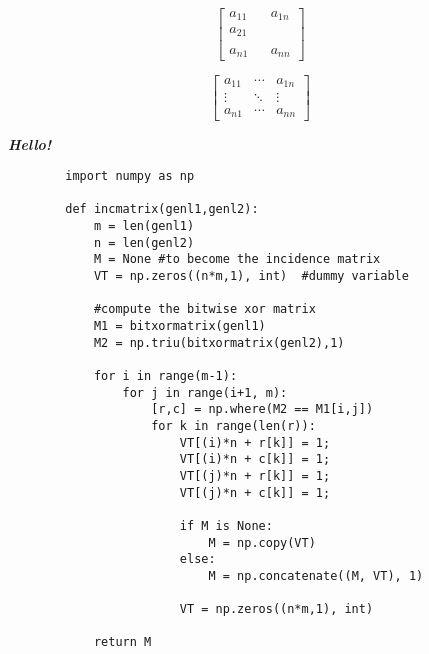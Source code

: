 \documentclass[12pt, a4paper]{article}
\begin{document}
    \begin{equation}
        \begin{bmatrix}
            a_{11} &  & a_{1n} \\
            a_{21} & & \\
            & & \\
            a_{n1} & & a_{nn}
        \end{bmatrix}
    \end{equation}
    
    \begin{equation}
        \begin{bmatrix}
            a_{11} & \cdots & a_{1n} \\
            \vdots & \ddots  & \vdots \\
            a_{n1} & \cdots & a_{nn}
        \end{bmatrix}
    \end{equation}

    \textbf{\textit{Hello!}}

    \begin{verbatim}
        import numpy as np
            
        def incmatrix(genl1,genl2):
            m = len(genl1)
            n = len(genl2)
            M = None #to become the incidence matrix
            VT = np.zeros((n*m,1), int)  #dummy variable
            
            #compute the bitwise xor matrix
            M1 = bitxormatrix(genl1)
            M2 = np.triu(bitxormatrix(genl2),1) 
        
            for i in range(m-1):
                for j in range(i+1, m):
                    [r,c] = np.where(M2 == M1[i,j])
                    for k in range(len(r)):
                        VT[(i)*n + r[k]] = 1;
                        VT[(i)*n + c[k]] = 1;
                        VT[(j)*n + r[k]] = 1;
                        VT[(j)*n + c[k]] = 1;
                        
                        if M is None:
                            M = np.copy(VT)
                        else:
                            M = np.concatenate((M, VT), 1)
                        
                        VT = np.zeros((n*m,1), int)
            
            return M
        \end{verbatim}
\end{document}
